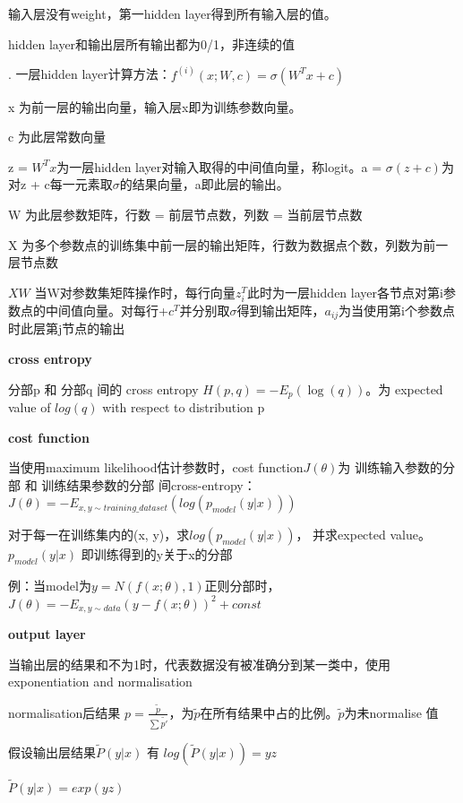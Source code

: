\documentclass[UTF8]{ctexart}
\begin{document}
  \quad \quad 输入层没有weight，第一hidden layer得到所有输入层的值。

  \quad \quad hidden layer和输出层所有输出都为0/1，非连续的值

  . 一层hidden layer计算方法：$ f^{(i)}(x; W, c) = \sigma (W^Tx + c)$

  \quad \quad x 为前一层的输出向量，输入层x即为训练参数向量。 

  \quad \quad c 为此层常数向量

  \quad \quad z = $W^Tx$为一层hidden layer对输入取得的中间值向量，称logit。a = $\sigma (z + c)$为对z + c每一元素取$\sigma $的结果向量，a即此层的输出。

  \quad \quad W 为此层参数矩阵，行数 = 前层节点数，列数 = 当前层节点数

  \quad \quad X 为多个参数点的训练集中前一层的输出矩阵，行数为数据点个数，列数为前一层节点数

  \quad \quad $XW$ 当W对参数集矩阵操作时，每行向量$z_{i}^T$此时为一层hidden layer各节点对第i参数点的中间值向量。对每行+$c^T$并分别取$\sigma $得到输出矩阵，$a_{ij}$为当使用第i个参数点时此层第j节点的输出

  \textbf{cross entropy}

  \quad 分部p 和 分部q 间的 cross entropy $H(p, q) = -E_p(\log (q))$。为 expected value of $log (q)$ with respect to distribution p

  \textbf{cost function}

  \quad 当使用maximum likelihood估计参数时，cost function$J(\theta )$为 训练输入参数的分部 和 训练结果参数的分部 间cross-entropy： $J(\theta ) = -E_{x, y\sim training\_dataset}(log (p_{model}(y | x)))$

  \quad \quad 对于每一在训练集内的(x, y)，求$log (p_{model}(y | x))$， 并求expected value。$p_{model}(y | x)$ 即训练得到的y关于x的分部

  \quad \quad 例：当model为$y = N(f(x; \theta), 1)$正则分部时，$J(\theta) = -E_{x, y\sim data}(y - f(x;\theta))^2 + const$

  \textbf{output layer}

  \quad 当输出层的结果和不为1时，代表数据没有被准确分到某一类中，使用exponentiation and normalisation

  \quad \quad normalisation后结果 $p = \frac{\tilde{p} }{\sum \tilde{p'} } $，为$\tilde{p} $在所有结果中占的比例。$\tilde{p} $为未normalise 值

  \quad 假设输出层结果$\tilde{P} (y | x)$ 有 $log(\tilde{P} (y | x)) = yz$

  \quad \quad $\tilde{P} (y | x) = exp(yz)$
\end{document}

